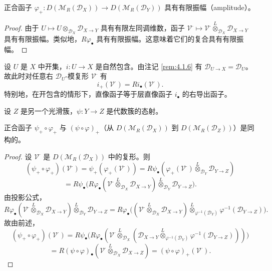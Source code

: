 \begin{lemma}\label{lem:4.5.1}
正合函子 $\varphi_+:D(\mathcal{M}_R(\mathcal{D}_X))\to D(\mathcal{M}_R(\mathcal{D}_Y))$ 具有有限振幅（amplitude）。
\end{lemma}

\begin{proof}
由于 $U\mapsto U\otimes_{\mathcal{D}_X}\mathcal{D}_{X\to Y}$ 具有有限左同调维数，函子
$\mathcal{V}^\cdot\mapsto\mathcal{V}^\cdot\overset{L}{\otimes}_{\mathcal{D}_X}\mathcal{D}_{X\to Y}$ 具有有限振幅。类似地，$R\varphi_\bullet$ 具有有限振幅。这意味着它们的复合具有有限振幅。
\end{proof}

\begin{remark}\label{rem:4.5.2}
设 $U$ 是 $X$ 中开集，$i:U\to X$ 是自然包含。由注记 \ref{rem:4.1.6} 有 $\mathcal{D}_{U\to X}=\mathcal{D}_U$。故此时对任意右 $\mathcal{D}_U$-模复形 $\mathcal{V}^\cdot$ 有
$$i_+(\mathcal{V}^\cdot)=Ri_\bullet(\mathcal{V}^\cdot).$$
特别地，在开包含的情形下，直像函子等于层直像函子 $i_\bullet$ 的右导出函子。
\end{remark}

设 $Z$ 是另一个光滑簇，$\psi:Y\to Z$ 是代数簇的态射。

\begin{theorem}\label{thm:4.5.3}
正合函子 $\psi_+\circ\varphi_+$ 与 $(\psi\circ\varphi)_+$（从 $D(\mathcal{M}_R(\mathcal{D}_X))$ 到
$D(\mathcal{M}_R(\mathcal{D}_Z))$）是同构的。
\end{theorem}

\begin{proof}
设 $\mathcal{V}^\cdot$ 是 $D(\mathcal{M}_R(\mathcal{D}_X))$ 中的复形。则
$$(\psi_+\circ\varphi_+)(\mathcal{V}^\cdot)=\psi_+(\varphi_+(\mathcal{V}^\cdot))
=R\psi_\bullet(\varphi_+(\mathcal{V}^\cdot)\overset{L}{\otimes}_{\mathcal{D}_Y}\mathcal{D}_{Y\to Z})$$
$$=R\psi_\bullet\bigl(R\varphi_\bullet(\mathcal{V}^\cdot\overset{L}{\otimes}_{\mathcal{D}_X}\mathcal{D}_{X\to Y})
\overset{L}{\otimes}_{\mathcal{D}_Y}\mathcal{D}_{Y\to Z}\bigr).$$
由投影公式，
$$R\varphi_\bullet(\mathcal{V}^\cdot\overset{L}{\otimes}_{\mathcal{D}_X}\mathcal{D}_{X\to Y})
\overset{L}{\otimes}_{\mathcal{D}_Y}\mathcal{D}_{Y\to Z}
=R\varphi_\bullet\bigl((\mathcal{V}^\cdot\overset{L}{\otimes}_{\mathcal{D}_X}\mathcal{D}_{X\to Y})
\overset{L}{\otimes}_{\varphi^{-1}(\mathcal{D}_Y)}\varphi^{-1}(\mathcal{D}_{Y\to Z})\bigr).$$
故由前述，
$$(\psi_+\circ\varphi_+)(\mathcal{V}^\cdot)
=R\psi_\bullet\bigl(R\varphi_\bullet(\mathcal{V}^\cdot\overset{L}{\otimes}_{\mathcal{D}_X}
(\mathcal{D}_{X\to Y}\overset{L}{\otimes}_{\varphi^{-1}(\mathcal{D}_Y)}\varphi^{-1}(\mathcal{D}_{Y\to Z})))\bigr)$$
$$=R(\psi\circ\varphi)_\bullet(\mathcal{V}^\cdot\overset{L}{\otimes}_{\mathcal{D}_X}\mathcal{D}_{X\to Z})
=(\psi\circ\varphi)_+(\mathcal{V}^\cdot).$$
\end{proof}

